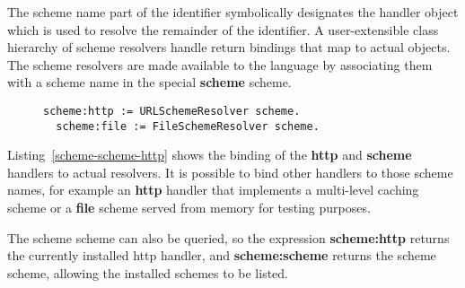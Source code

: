 \documentclass[preprint,authoryear]{acm_proc_article-sp}
\begin{document}
The scheme name part of the identifier symbolically designates the handler object which 
is used to resolve the remainder of the identifier.   A user-extensible class hierarchy of
scheme resolvers handle 
return bindings that map to actual objects. The scheme resolvers are made available to the 
language by associating them with a scheme name in the special {\bf scheme} scheme.


\begin{figure}[htbp]
\begin{lstlisting}[style=L,label=scheme-scheme-http,caption=Adding the http and file schemes.]
  scheme:http := URLSchemeResolver scheme.
  scheme:file := FileSchemeResolver scheme.
\end{lstlisting}
\end{figure}

Listing~\ref{scheme-scheme-http} shows the binding of the {\bf http} and {\bf scheme}
handlers to actual resolvers.  It is possible to bind other handlers to those scheme
names, for example an {\bf http} handler that implements a multi-level caching scheme
or a {\bf file} scheme served from memory for testing purposes.


The scheme scheme can also be queried,
so the expression {\bf scheme:http} returns the currently installed http handler, and 
{\bf scheme:scheme} returns the scheme scheme, allowing the installed schemes to
be listed.

\end{document}
